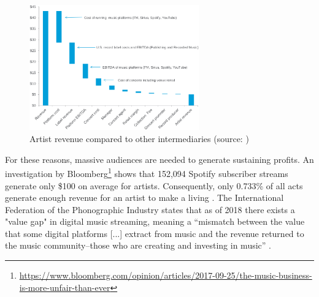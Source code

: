 \begin{figure}
    \centering
    \includegraphics[width=0.65\textwidth]{problem-description/artist-revenue.png}
    \caption{Artist revenue compared to other intermediaries (source: \cite{bazinet2018putting})}
    \label{fig:artist-revenue}
\end{figure}

For these reasons, massive audiences are needed to generate sustaining profits. An investigation by Bloomberg\footnote{\url{https://www.bloomberg.com/opinion/articles/2017-09-25/the-music-business-is-more-unfair-than-ever}} shows that 152,094 Spotify subscriber streams generate only \$100 on average for artists. Consequently, only 0.733\% of all acts generate enough revenue for an artist to make a living \citep{ingham2018odds}. The International Federation of the Phonographic Industry states that as of 2018 there exists a "value gap" in digital music streaming, meaning a ``mismatch between the value that some digital platforms [...] extract from music and the revenue returned to the music community–those who are creating and investing in music'' \citep{ifpi2018global}.

